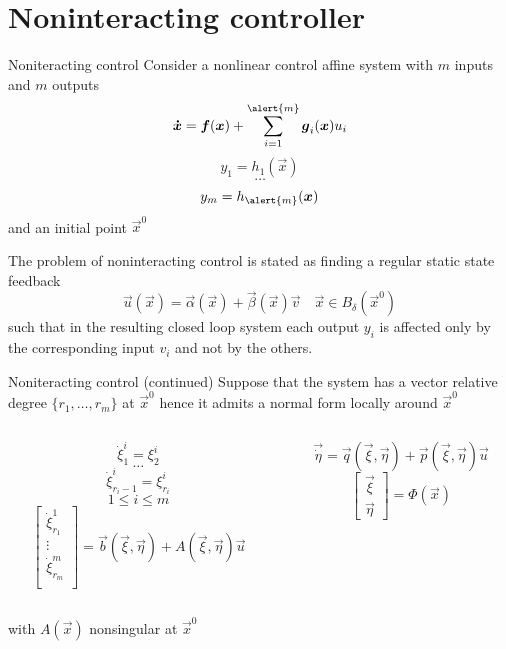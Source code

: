 \section{Noninteracting controller}

\begin{frame}[shrink=10]{Noniteracting control \theory}
  Consider a nonlinear control affine system with $m$ inputs and $m$ outputs
  \[
  \vec{\dot{x}} = \vec{f}(\vec{x}) + \sum\limits_{i=1}^{\alert{m}} \vec{g}_{i}(\vec{x}) u_{i}
  \]
  \[
  y_{1} = h_{1}(\vec{x})
  \]
  \[
  \hdots
  \]
  \[
  y_{m} = h_{\alert{m}}(\vec{x})
  \]
  and an initial point $\vec{x}^{0}$
  \par
  The problem of noninteracting control is stated as finding a regular static state feedback
  \[
  \vec{u}(\vec{x})  = \vec{\alpha}(\vec{x}) + \vec{\beta}(\vec{x}) \vec{v} \quad \vec{x} \in B_{\delta}(\vec{x}^0)
  \]
  such that in the resulting closed loop system each output $y_i$ is affected
  only by the corresponding input $v_i$ and not by the others.
\end{frame}

\begin{frame}{Noniteracting control (continued) \theory}
  Suppose that the system has a vector relative degree $\{r_1, \hdots, r_m\}$ at $\vec{x}^{0}$ hence it admits
  a \alert{normal form} locally around $\vec{x}^{0}$
  \begin{columns}[t]
    \begin{column}{0.5\textwidth}
      \[
      \dot{\xi}_{1}^{i} = \xi_{2}^{i}
      \]
      \[
      \hdots
      \]
      \[
      \dot{\xi}_{r_{i}-1}^{i} = \xi_{r_{i}}^{i}
      \]
      \[
      1 \le i \le m
      \]
      \[
      \begin{bmatrix}
        \dot{\xi}_{r_{1}}^{1}\\
        \vdots\\
        \dot{\xi}_{r_{m}}^{m}\\
      \end{bmatrix}=
      \vec{b}(\vec{\xi},\vec{\eta}) + A(\vec{\xi},\vec{\eta})\vec{u}
      \]
    \end{column}
    \begin{column}{0.5\textwidth}
      \[
      \vec{\dot{\eta}} = \vec{q}(\vec{\xi},\vec{\eta}) + \vec{p}(\vec{\xi},\vec{\eta})\vec{u}
      \]
      \vskip0.3in
      \[
      \begin{bmatrix}
        \vec{\xi}\\
        \vec{\eta}
      \end{bmatrix} = 
      \Phi(\vec{x})
      \]
    \end{column}
  \end{columns}
  \centering
  with $A(\vec{x})$ nonsingular at $\vec{x}^{0}$
\end{frame}

